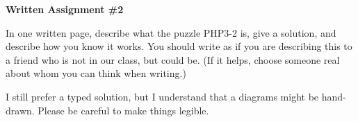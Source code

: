 \documentclass[12pt,letterpaper]{article}
\begin{document}
\setlength{\parskip}{1ex plus 0.5ex minus 0.2ex}
\setlength{\parindent}{0pt}

\pagestyle{fancy}
\lfoot{}
\rfoot{}

\begin{center}
{
\Large
\textbf{Written Assignment \#2}
}
\end{center}

In one written page, describe what the puzzle PHP3-2 is, give a solution, and describe how you know it works.
You should write as if you are describing this to a friend who is not in our class, but could be.
(If it helps, choose someone real about whom you can think when writing.)

I still prefer a typed solution, but I understand that a diagrams might be hand-drawn. Please be careful to make things legible.

\clearpage
\end{document}
